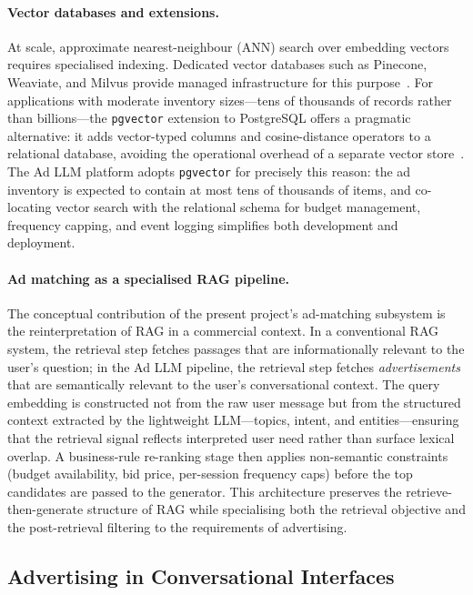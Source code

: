 \paragraph{Vector databases and extensions.}
At scale, approximate nearest-neighbour (ANN) search over embedding
vectors requires specialised indexing. Dedicated vector databases such
as Pinecone, Weaviate, and Milvus provide managed infrastructure for
this purpose~\cite{jing2024vectordb}. For applications with moderate
inventory sizes---tens of thousands of records rather than
billions---the \texttt{pgvector} extension to PostgreSQL offers a
pragmatic alternative: it adds vector-typed columns and
cosine-distance operators to a relational database, avoiding the
operational overhead of a separate vector
store~\cite{pgvector2023}. The Ad LLM platform adopts
\texttt{pgvector} for precisely this reason: the ad inventory is
expected to contain at most tens of thousands of items, and
co-locating vector search with the relational schema for budget
management, frequency capping, and event logging simplifies both
development and deployment.

\paragraph{Ad matching as a specialised RAG pipeline.}
The conceptual contribution of the present project's ad-matching
subsystem is the reinterpretation of RAG in a commercial context. In
a conventional RAG system, the retrieval step fetches passages that
are informationally relevant to the user's question; in the Ad LLM
pipeline, the retrieval step fetches \emph{advertisements} that are
semantically relevant to the user's conversational context. The query
embedding is constructed not from the raw user message but from the
structured context extracted by the lightweight LLM---topics, intent,
and entities---ensuring that the retrieval signal reflects interpreted
user need rather than surface lexical overlap. A business-rule
re-ranking stage then applies non-semantic constraints (budget
availability, bid price, per-session frequency caps) before the top
candidates are passed to the generator. This architecture preserves
the retrieve-then-generate structure of RAG while specialising both
the retrieval objective and the post-retrieval filtering to the
requirements of advertising.

\subsection{Advertising in Conversational Interfaces}
\label{subsec:conversational-ads}

